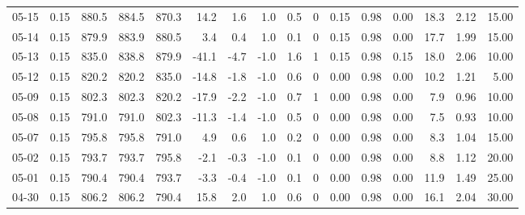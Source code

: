 \begin{threeparttable}
{\begin{tabular}{lrrrrrrrrrrrrrrr}
  05-15 &     0.15 & 880.5 & 884.5 & 870.3 &       14.2 &            1.6 &                      1.0 &                 0.5 &              0 &       0.15 &      0.98 &           0.00 &             18.3 &            2.12 &                  15.00 \\
  05-14 &     0.15 & 879.9 & 883.9 & 880.5 &        3.4 &            0.4 &                      1.0 &                 0.1 &              0 &       0.15 &      0.98 &           0.00 &             17.7 &            1.99 &                  15.00 \\
  05-13 &     0.15 & 835.0 & 838.8 & 879.9 &      -41.1 &           -4.7 &                     -1.0 &                 1.6 &              1 &       0.15 &      0.98 &           0.15 &             18.0 &            2.06 &                  10.00 \\
  05-12 &     0.15 & 820.2 & 820.2 & 835.0 &      -14.8 &           -1.8 &                     -1.0 &                 0.6 &              0 &       0.00 &      0.98 &           0.00 &             10.2 &            1.21 &                   5.00 \\
  05-09 &     0.15 & 802.3 & 802.3 & 820.2 &      -17.9 &           -2.2 &                     -1.0 &                 0.7 &              1 &       0.00 &      0.98 &           0.00 &              7.9 &            0.96 &                  10.00 \\
  05-08 &     0.15 & 791.0 & 791.0 & 802.3 &      -11.3 &           -1.4 &                     -1.0 &                 0.5 &              0 &       0.00 &      0.98 &           0.00 &              7.5 &            0.93 &                  10.00 \\
  05-07 &     0.15 & 795.8 & 795.8 & 791.0 &        4.9 &            0.6 &                      1.0 &                 0.2 &              0 &       0.00 &      0.98 &           0.00 &              8.3 &            1.04 &                  15.00 \\
  05-02 &     0.15 & 793.7 & 793.7 & 795.8 &       -2.1 &           -0.3 &                     -1.0 &                 0.1 &              0 &       0.00 &      0.98 &           0.00 &              8.8 &            1.12 &                  20.00 \\
  05-01 &     0.15 & 790.4 & 790.4 & 793.7 &       -3.3 &           -0.4 &                     -1.0 &                 0.1 &              0 &       0.00 &      0.98 &           0.00 &             11.9 &            1.49 &                  25.00 \\
  04-30 &     0.15 & 806.2 & 806.2 & 790.4 &       15.8 &            2.0 &                      1.0 &                 0.6 &              0 &       0.00 &      0.98 &           0.00 &             16.1 &            2.04 &                  30.00 \\

\end{tabular}}
\end{threeparttable}
